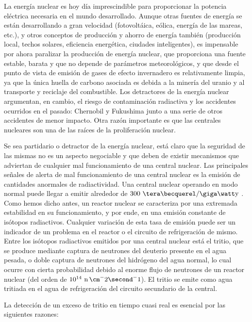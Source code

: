 La energía nuclear es hoy día imprescindible para proporcionar la potencia eléctrica necesaria en el mundo desarrollado.  Aunque  otras fuentes de energía se están desarrollando a gran velocidad (fotovoltáica, eólica, energía de las mareas, etc.), y otros conceptos de producción y ahorro de energía también (producción local, techos solares, eficiencia energética, ciudades inteligentes), es impensable por ahora paralizar la producción de energía nuclear, que proporciona una fuente estable, barata y que no depende de parámetros meteorológicos, y que desde el  punto de vista de emisión de gases de efecto invernadero es relativamente limpia, ya que la única huella de carbono asociada es debida a la minería del uranio y al transporte y reciclaje del combustible.
Los detractores de la energía nuclear argumentan, en cambio, el riesgo de contaminación radiactiva y los accidentes ocurridos en el pasado: Chernobil y Fukushima junto a una serie de otros accidentes de menor impacto. Otra razón importante es que las centrales nucleares son una de las raíces de la proliferación nuclear.

Se sea partidario o detractor de la energía nuclear, está claro que la seguridad de las mismas no es un aspecto  negociable y que deben de existir mecanismos que adviertan de cualquier mal funcionamiento de una central nuclear.  Las principales señales de alerta de mal funcionamiento de una central nuclear es la emisión de cantidades anormales de radiactividad. Una central nuclear operando en modo normal puede llegar a emitir alrededor de $300\ \tera\becquerel/\giga\watt\mathrm{y}$ \cite{300TBq}. Como hemos dicho antes, un reactor nuclear se caracteriza por una extremada estabilidad en su funcionamiento, y por ende, en una emisión constante  de isótopos radiactivos.  Cualquier variación de esta tasa de emisión puede ser un indicador de un problema en el reactor o el circuito de refrigeración de mismo. Entre los isótopos radiactivos emitidos por una central  nuclear está el tritio, que se produce mediante captura de neutrones del deuterio presente en el  agua pesada, o doble captura de neutrones del hidrógeno del agua normal, lo cual ocurre con cierta probabilidad debido al enorme flujo de neutrones de un reactor nuclear (del orden de $10^{14} ~\ce{n} \, \cm^-2\second^-1$).  El tritio se emite como agua tritiada en el agua de refrigeración del circuito secundario  de la central.  

La detección de un exceso de tritio en tiempo cuasi real es esencial por las siguientes razones:

